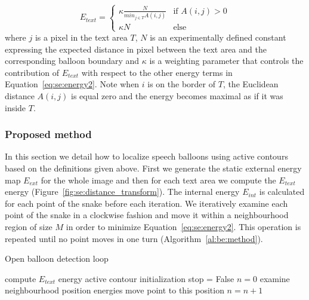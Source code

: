 \begin{equation}\label{eq:se:know}
E_{text} = \begin{cases} \kappa \frac{N}{min_{j \in T} A(i,j)} & \mbox{if } A(i,j) > 0 \\ \kappa N & \mbox{else} \end{cases}
\end{equation}
where $j$ is a pixel in the text area $T$, $N$ is an experimentally defined constant expressing the expected distance in pixel between the text area and the corresponding balloon boundary and $\kappa$ is a weighting parameter that controls the contribution of $E_{text}$ with respect to the other energy terms in Equation~\ref{eq:se:energy2}.
Note when $i$ is on the border of $T$, the Euclidean distance $A(i,j)$ is equal zero and the energy becomes maximal as if it was inside $T$.


\subsubsection{Proposed method}
\label{sec:proposed_method}

In this section we detail how to localize speech balloons using active contours based on the definitions given above. 
First we generate the static external energy map $E_{ext}$ for the whole image and then for each text area we compute the $E_{text}$ energy (Figure~\ref{fig:se:distance_transform}).
The internal energy $E_{int}$ is calculated for each point of the snake before each iteration.
We iteratively examine each point of the snake in a clockwise fashion and move it within a neighbourhood region of size $M$ in order to minimize Equation~\ref{eq:se:energy2}.
This operation is repeated until no point moves in one turn (Algorithm~\ref{al:be:method}).


\begin{algorithm}[!ht]
\caption{Open balloon detection loop}
\label{al:be:method}
\begin{algorithmic}
  \STATE compute $E_{text}$ energy
  \STATE active contour initialization
  \STATE stop = False
    \STATE $n = 0$
      \STATE examine neighbourhood position energies
		\STATE move point to this position
		\STATE $n=n+1$
      \ENDIF
    \ENDFOR
    \ENDIF
  \ENDWHILE%
\ENDFOR
\end{algorithmic}
\end{algorithm}


